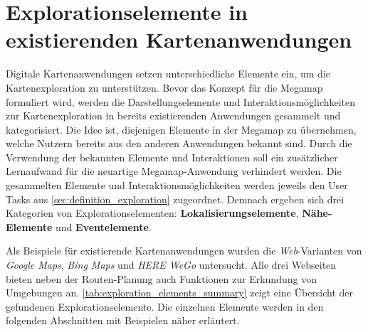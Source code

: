 \section{Explorationselemente in existierenden Kartenanwendungen}
Digitale Kartenanwendungen setzen unterschiedliche Elemente ein, um die Kartenexploration zu unterstützen.
Bevor das Konzept für die Megamap formuliert wird, werden die Darstellungselemente und Interaktionsmöglichkeiten zur Kartenexploration in bereits existierenden Anwendungen gesammelt und kategorisiert.
Die Idee ist, diejenigen Elemente in der Megamap zu übernehmen, welche Nutzern bereits aus den anderen Anwendungen bekannt sind.
Durch die Verwendung der bekannten Elemente und Interaktionen soll ein zusätzlicher Lernaufwand für die neuartige Megamap-Anwendung verhindert werden.
Die gesammelten Elemente und Interaktionsmöglichkeiten werden jeweils den User Tasks aus \autoref{sec:definition_exploration} zugeordnet.
Demnach ergeben sich drei Kategorien von Explorationselementen: \textbf{Lokalisierungselemente}, \textbf{Nähe-Elemente} und \textbf{Eventelemente}.

Als Beispiele für existierende Kartenanwendungen wurden die \emph{Web}-Varianten von \emph{Google Maps}, \emph{Bing Maps} \parencite{Microsoft2018b} und \emph{HERE WeGo} \parencite{HERE2018} untersucht.
Alle drei Webseiten bieten neben der Routen-Planung auch Funktionen zur Erkundung von Umgebungen an.
\autoref{tab:exploration_elements_summary} zeigt eine Übersicht der gefundenen Explorationselemente.
Die einzelnen Elemente werden in den folgenden Abschnitten mit Beispielen näher erläutert.

